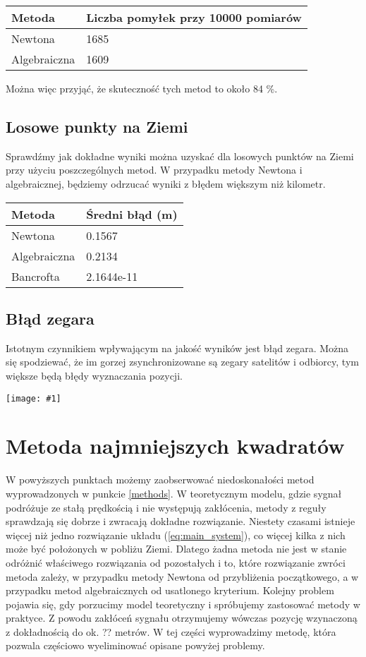 \documentclass{article}
\newcommand{\plot}[1] {
	\texttt{[image: \#1]}
}
\begin{document}
\begin{tabular}{ |p{4cm}|p{6cm}|  }
 \hline
 	Metoda  & Liczba pomyłek przy 10000 pomiarów\\
 \hline 
  	Newtona & 1685 \\
 \hline 
 	Algebraiczna & 1609 \\
 \hline
\end{tabular}

	 Można więc przyjąć, że skuteczność tych metod to około 84 \%.
	
\subsection{Losowe punkty na Ziemi}
	Sprawdźmy jak dokładne wyniki można uzyskać dla losowych punktów na Ziemi przy użyciu poszczególnych metod. W przypadku metody Newtona i algebraicznej, będziemy odrzucać wyniki z błędem większym niż kilometr.
	
	\begin{tabular}{ |p{4cm}|p{6cm}|  }
 \hline
 	Metoda  & Średni błąd (m) \\
 \hline 
  	Newtona & 0.1567 \\
 \hline 
 	Algebraiczna & 0.2134 \\
 \hline
 	Bancrofta & 2.1644e-11\\
 \hline
\end{tabular}
	
	
\subsection{ Błąd zegara }
Istotnym czynnikiem wpływającym na jakość wyników jest błąd zegara. Można się spodziewać, że im gorzej zsynchronizowane są zegary satelitów i odbiorcy, tym większe będą błędy wyznaczania pozycji.

\plot{zegar.png}


\section{Metoda najmniejszych kwadratów}
W powyższych punktach możemy zaobserwować niedoskonałości metod wyprowadzonych w punkcie \ref{methods}.
W teoretycznym modelu, gdzie sygnał podróżuje ze stałą prędkością i nie występują zakłócenia, metody z reguły
sprawdzają się dobrze i zwracają dokładne rozwiązanie. Niestety czasami istnieje więcej niż jedno rozwiązanie układu
(\ref{eq:main_system}), co więcej kilka z nich może być położonych w pobliżu Ziemi. Dlatego żadna metoda nie jest w stanie
odróżnić właściwego rozwiązania od pozostałych i to, które rozwiązanie zwróci metoda zależy, w przypadku metody
Newtona od przybliżenia początkowego, a w przypadku metod algebraicznych od usatlonego kryterium.
Kolejny problem pojawia się, gdy porzucimy model teoretyczny i spróbujemy zastosować metody w praktyce.
Z powodu zakłóceń sygnału otrzymujemy wówczas pozycję wzynaczoną z dokładnością do ok. ?? metrów.
W tej części wyprowadzimy metodę, która pozwala częściowo wyeliminować opisane powyżej problemy.
\end{document}
